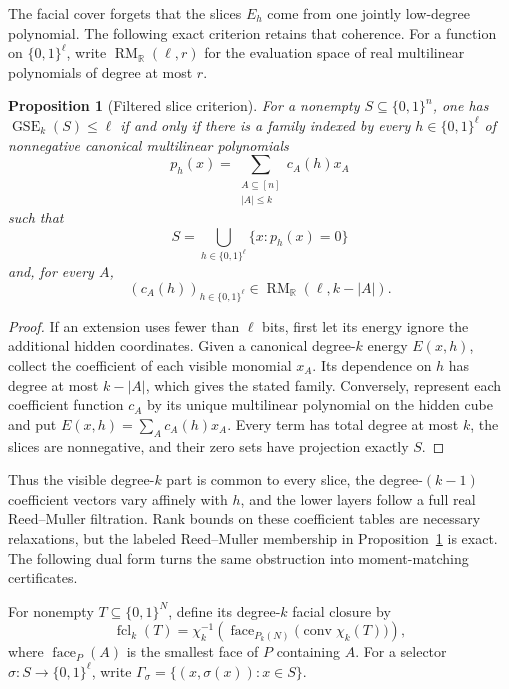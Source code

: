 \documentclass{article}
\newcommand{\GSE}{\operatorname{GSE}}
\newcommand{\fcl}{\operatorname{fcl}}
\newcommand{\bits}{\{0,1\}}
\newtheorem{proposition}{Proposition}
\begin{document}
The facial cover forgets that the slices $E_h$ come from one jointly
low-degree polynomial.  The following exact criterion retains that coherence.
For a function on $\bits^\ell$, write
$\operatorname{RM}_{\mathbb R}(\ell,r)$ for the evaluation space of real
multilinear polynomials of degree at most $r$.

\begin{proposition}[Filtered slice criterion]
\label{prop:filtered-slices}
For a nonempty $S\subseteq\bits^n$, one has $\GSE_k(S)\le\ell$ if and only if
there is a family indexed by every $h\in\bits^\ell$ of nonnegative canonical
multilinear polynomials
\[
  p_h(x)=\sum_{\substack{A\subseteq[n]\\|A|\le k}}c_A(h)x_A
\]
such that
\[
  S=\bigcup_{h\in\bits^\ell}\{x:p_h(x)=0\}
\]
and, for every $A$,
\[
  (c_A(h))_{h\in\bits^\ell}
  \in\operatorname{RM}_{\mathbb R}(\ell,k-|A|).
\]
\end{proposition}

\begin{proof}
If an extension uses fewer than $\ell$ bits, first let its energy ignore the
additional hidden coordinates.  Given a canonical degree-$k$ energy $E(x,h)$,
collect the coefficient of each visible monomial $x_A$.  Its dependence on $h$
has degree at most $k-|A|$, which gives the stated family.  Conversely,
represent each coefficient function $c_A$ by its unique multilinear polynomial
on the hidden cube and put $E(x,h)=\sum_A c_A(h)x_A$.  Every term has total
degree at most $k$, the slices are nonnegative, and their zero sets have
projection exactly $S$.
\end{proof}

Thus the visible degree-$k$ part is common to every slice, the degree-$(k-1)$
coefficient vectors vary affinely with $h$, and the lower layers follow a full
real Reed--Muller filtration.  Rank bounds on these coefficient tables are
necessary relaxations, but the labeled Reed--Muller membership in
Proposition~\ref{prop:filtered-slices} is exact.  The following dual form turns
the same obstruction into moment-matching certificates.

For nonempty $T\subseteq\bits^N$, define its degree-$k$ facial closure by
\[
  \fcl_k(T)
  =\chi_k^{-1}\!\left(
    \operatorname{face}_{P_k(N)}
      \bigl(\operatorname{conv}\chi_k(T)\bigr)
  \right),
\]
where $\operatorname{face}_{P}(A)$ is the smallest face of $P$ containing
$A$.  For a selector $\sigma:S\to\bits^\ell$, write
$\Gamma_\sigma=\{(x,\sigma(x)):x\in S\}$.
\end{document}
